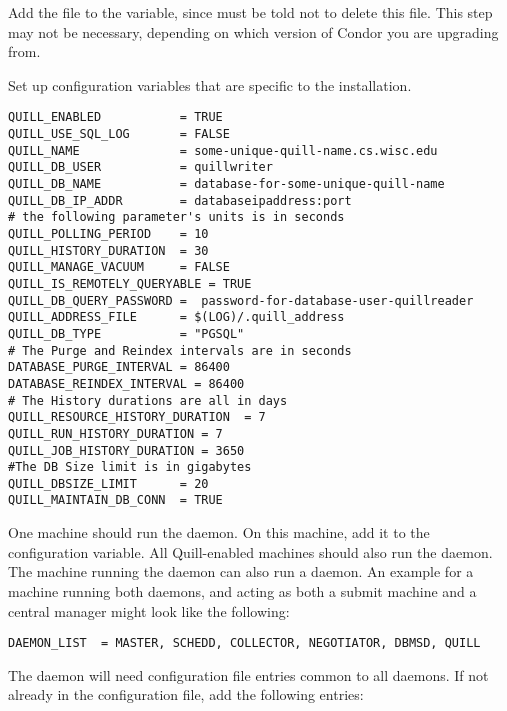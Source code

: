 \begin{description}
\item Add the file  to the 
   variable, since  must
  be told not to delete this file.
  This step may not be necessary, depending on which version of Condor 
  you are upgrading from. 
 
\item Set up configuration variables that are specific
  to the installation.
\footnotesize
\begin{verbatim}
QUILL_ENABLED           = TRUE
QUILL_USE_SQL_LOG       = FALSE
QUILL_NAME              = some-unique-quill-name.cs.wisc.edu
QUILL_DB_USER           = quillwriter
QUILL_DB_NAME           = database-for-some-unique-quill-name
QUILL_DB_IP_ADDR        = databaseipaddress:port
# the following parameter's units is in seconds
QUILL_POLLING_PERIOD    = 10
QUILL_HISTORY_DURATION 	= 30
QUILL_MANAGE_VACUUM     = FALSE
QUILL_IS_REMOTELY_QUERYABLE = TRUE
QUILL_DB_QUERY_PASSWORD =  password-for-database-user-quillreader
QUILL_ADDRESS_FILE      = $(LOG)/.quill_address
QUILL_DB_TYPE           = "PGSQL"
# The Purge and Reindex intervals are in seconds
DATABASE_PURGE_INTERVAL	= 86400
DATABASE_REINDEX_INTERVAL = 86400
# The History durations are all in days 
QUILL_RESOURCE_HISTORY_DURATION  = 7
QUILL_RUN_HISTORY_DURATION = 7
QUILL_JOB_HISTORY_DURATION = 3650
#The DB Size limit is in gigabytes
QUILL_DBSIZE_LIMIT      = 20
QUILL_MAINTAIN_DB_CONN  = TRUE

\end{verbatim}
\normalsize

\end{description}

One machine should run the  daemon.  
On this machine, add it to the  configuration variable.
All Quill-enabled machines should also run the  daemon.
The machine running the  daemon can also 
run a  daemon.  An example 
for a machine running both daemons,
and acting as both a submit machine and a central manager might 
look like the following:

\footnotesize
\begin{verbatim}
DAEMON_LIST  = MASTER, SCHEDD, COLLECTOR, NEGOTIATOR, DBMSD, QUILL
\end{verbatim}
\normalsize

The  daemon will need configuration file entries
common to all daemons.
If not already in the configuration file, add the following entries:

